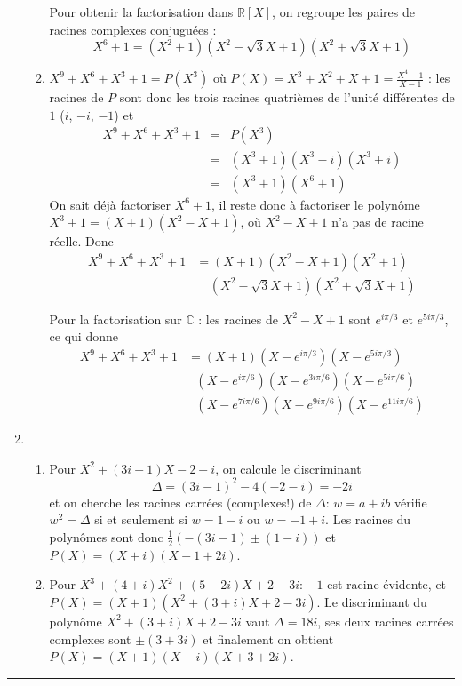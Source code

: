 \documentclass[11pt,a4paper]{article}
\newcommand{\Rr}{\mathbb{R}} \newcommand{\R}{\mathbb{R}}
\newcommand{\Cc}{\mathbb{C}} \newcommand{\C}{\mathbb{C}}
\newcommand{\fincorrection}{\vspace{1mm}\hrule\vspace*{7mm}}
\begin{document}
\begin{enumerate}
\begin{enumerate}
Pour obtenir la factorisation dans $\Rr[X]$, on regroupe les paires de racines complexes conjuguées :
$$X^6+1=(X^2+1)(X^2-\sqrt{3}X+1)(X^2+\sqrt{3}X+1)$$

\item $X^9+X^6+X^3+1=P(X^3)$ où $P(X)=X^3+X^2+X+1=\frac{X^4-1}{X-1}$ : 
les racines de $P$ sont donc les trois racines quatrièmes de l'unité 
différentes de $1$ ($i$, $-i$, $-1$) et 
$$\begin{array}{rcl}
X^9+X^6+X^3+1&=&P(X^3)\\
 &=&(X^3+1)(X^3-i)(X^3+i)\\
 &=&(X^3+1)(X^6+1)
\end{array}$$
On sait déjà factoriser $X^6+1$, il reste donc à factoriser le polynôme 
$X^3+1=(X+1)(X^2-X+1)$, où $X^2-X+1$ n'a pas de racine réelle. Donc
$$\begin{array}{rl}
X^9+X^6+X^3+1&=(X+1)(X^2-X+1)(X^2+1)\\
 & \ \ \ \ \ (X^2-\sqrt{3}X+1)(X^2+\sqrt{3}X+1)
\end{array}$$

Pour la factorisation sur $\Cc$ : les racines de $X^2-X+1$ sont $e^{i\pi/3}$ et $e^{5i\pi/3}$, ce qui donne
$$\begin{array}{rl}
X^9+X^6+X^3+1&=(X+1)(X-e^{i\pi/3})(X-e^{5i\pi/3})\\
 &\ \ \ (X-e^{i\pi/6})(X-e^{3i\pi/6})(X-e^{5i\pi/6})\\
 &\ \ \ (X-e^{7i\pi/6})(X-e^{9i\pi/6})(X-e^{11i\pi/6})
\end{array}$$
\end{enumerate}

\item 
\begin{enumerate}
\item Pour $X^2+(3i-1)X-2-i$, on calcule le discriminant 
$$\Delta=(3i-1)^2-4(-2-i)=-2i$$ 
et on cherche les racines carrées (complexes!) de $\Delta$: $w=a+ib$ 
vérifie $w^2=\Delta$ si et seulement si $w=1-i$ ou $w=-1+i$. 
Les racines du polynômes sont donc $\frac{1}{2}(-(3i-1)\pm(1-i))$ 
et $P(X)=(X+i)(X-1+2i)$.

\item Pour $X^3+(4+i)X^2+(5-2i)X+2-3i$: $-1$ est racine évidente, et $P(X)=(X+1)(X^2+(3+i)X+2-3i)$. 
Le discriminant du polynôme $X^2+(3+i)X+2-3i$ vaut $\Delta=18i$, 
ses deux racines carrées complexes sont $\pm(3+3i)$ et finalement 
on obtient $P(X)=(X+1)(X-i)(X+3+2i)$.
\end{enumerate}
\end{enumerate}
\fincorrection
\end{document}
